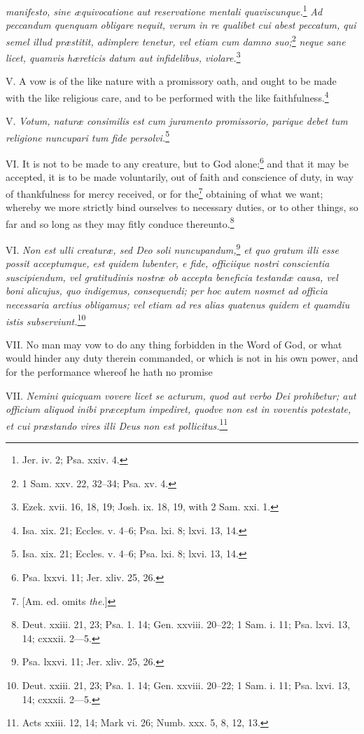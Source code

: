 \emph{manifesto, sine æquivocatione aut reservatione mentali quaviscunque.}\footnote{Jer. iv. 2; Psa. xxiv. 4.}\emph{ Ad peccandum quenquam obligare nequit, verum in re qualibet cui abest peccatum, qui semel illud præstitit, adimplere tenetur, vel etiam cum damno suo;}\footnote{1 Sam. xxv. 22, 32–34; Psa. xv. 4.}\emph{ neque sane licet, quamvis hæreticis datum aut infidelibus, violare.}\footnote{Ezek. xvii. 16, 18, 19; Josh. ix. 18, 19, with 2 Sam. xxi. 1.}

V. A vow is of the like nature with a promissory oath, and ought to be made with the like religious care, and to be performed with the like faithfulness.\footnote{Isa. xix. 21; Eccles. v. 4–6; Psa. lxi. 8; lxvi. 13, 14.}

V. \emph{Votum, naturæ consimilis est cum juramento promissorio, parique debet tum religione nuncupari tum fide persolvi.}\footnote{Isa. xix. 21; Eccles. v. 4–6; Psa. lxi. 8; lxvi. 13, 14.}

VI. It is not to be made to any creature, but to God alone:\footnote{Psa. lxxvi. 11; Jer. xliv. 25, 26.} and that it may be accepted, it is to be made voluntarily, out of faith and conscience of duty, in way of thankfulness for mercy received, or for the\footnote{[Am. ed. omits \emph{the.}]} obtaining of what we want; whereby we more strictly bind ourselves to necessary duties, or to other things, so far and so long as they may fitly conduce thereunto.\footnote{Deut. xxiii. 21, 23; Psa. 1. 14; Gen. xxviii. 20–22; 1 Sam. i. 11; Psa. lxvi. 13, 14; cxxxii. 2—5.}

VI. \emph{Non est ulli creaturæ, sed Deo soli nuncupandum,}\footnote{Psa. lxxvi. 11; Jer. xliv. 25, 26.}\emph{ et quo gratum illi esse possit acceptumque, est quidem lubenter, e fide, officiique nostri conscientia suscipiendum, vel gratitudinis nostræ ob accepta beneficia testandæ causa, vel boni alicujus, quo indigemus, consequendi; per hoc autem nosmet ad officia necessaria arctius obligamus; vel etiam ad res alias quatenus quidem et quamdiu istis subserviunt.}\footnote{Deut. xxiii. 21, 23; Psa. 1. 14; Gen. xxviii. 20–22; 1 Sam. i. 11; Psa. lxvi. 13, 14; cxxxii. 2—5.}

VII. No man may vow to do any thing forbidden in the Word of God, or what would hinder any duty therein commanded, or which is not in his own power, and for the performance whereof he hath no promise

VII. \emph{Nemini quicquam vovere licet se acturum, quod aut verbo Dei prohibetur; aut officium aliquod inibi præceptum impediret, quodve non est in voventis potestate, et cui præstando vires illi Deus non est pollicitus.}\footnote{Acts xxiii. 12, 14; Mark vi. 26; Numb. xxx. 5, 8, 12, 13.}

